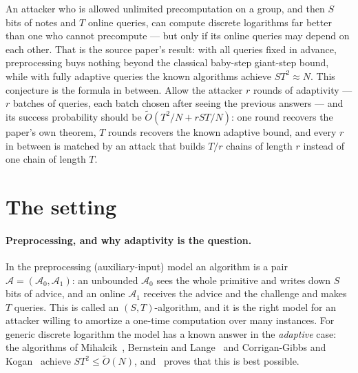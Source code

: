 \documentclass{conjura-conjecture}
\newcommand{\Adv}{\mathcal{A}}
\newcommand{\Ot}{\widetilde{O}}
\begin{document}

\vspace{0.4em}

\begin{informalconjecture}
An attacker who is allowed unlimited precomputation on a group, and
then $S$ bits of notes and $T$ online queries, can compute discrete
logarithms far better than one who cannot precompute --- but only if
its online queries may depend on each other. That is the source paper's
result: with all queries fixed in advance, preprocessing buys nothing
beyond the classical baby-step giant-step bound, while with fully
adaptive queries the known algorithms achieve $ST^{2} \approx N$. This
conjecture is the formula in between. Allow the attacker $r$ rounds of
adaptivity --- $r$ batches of queries, each batch chosen after seeing
the previous answers --- and its success probability should be
$\Ot(T^{2}/N + rST/N)$: one round recovers the paper's own theorem,
$T$ rounds recovers the known adaptive bound, and every $r$ in between
is matched by an attack that builds $T/r$ chains of length $r$ instead
of one chain of length $T$.
\end{informalconjecture}

\section{The setting}\label{sec:setting}

\paragraph{Preprocessing, and why adaptivity is the question.}
In the preprocessing (auxiliary-input) model an algorithm is a pair
$\Adv = (\Adv_{0}, \Adv_{1})$: an unbounded $\Adv_{0}$ sees the whole
primitive and writes down $S$ bits of advice, and an online $\Adv_{1}$
receives the advice and the challenge and makes $T$ queries. This is
called an $(S,T)$-algorithm, and it is the right model for an attacker
willing to amortize a one-time computation over many instances. For
generic discrete logarithm the model has a known answer in the
\emph{adaptive} case: the algorithms of Mihalcik~\cite{Mih10}, Bernstein
and Lange~\cite{BL13} and Corrigan-Gibbs and Kogan~\cite{CK18} achieve
$ST^{2} \le \Ot(N)$, and~\cite{CK18} proves that this is best possible.
\end{document}
